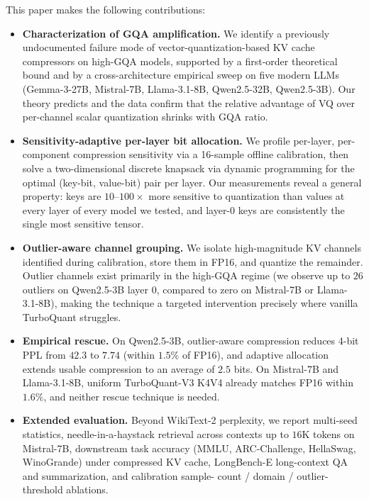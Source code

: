 \documentclass[11pt]{article}
\begin{document}
This paper makes the following contributions:
\begin{itemize}
    \item \textbf{Characterization of GQA amplification.} We identify a
    previously undocumented failure mode of vector-quantization-based KV cache
    compressors on high-GQA models, supported by a first-order theoretical
    bound and by a cross-architecture empirical sweep on five modern LLMs
    (Gemma-3-27B, Mistral-7B, Llama-3.1-8B, Qwen2.5-32B, Qwen2.5-3B). Our
    theory predicts and the data confirm that the relative advantage of VQ
    over per-channel scalar quantization shrinks with GQA ratio.
    \item \textbf{Sensitivity-adaptive per-layer bit allocation.} We profile
    per-layer, per-component compression sensitivity via a 16-sample offline
    calibration, then solve a two-dimensional discrete knapsack via dynamic
    programming for the optimal (key-bit, value-bit) pair per layer. Our
    measurements reveal a general property: keys are $10$--$100\times$ more
    sensitive to quantization than values at every layer of every model we
    tested, and layer-0 keys are consistently the single most sensitive
    tensor.
    \item \textbf{Outlier-aware channel grouping.} We isolate high-magnitude
    KV channels identified during calibration, store them in FP16, and
    quantize the remainder. Outlier channels exist primarily in the high-GQA
    regime (we observe up to $26$ outliers on Qwen2.5-3B layer 0, compared to
    zero on Mistral-7B or Llama-3.1-8B), making the technique a targeted
    intervention precisely where vanilla TurboQuant struggles.
    \item \textbf{Empirical rescue.} On Qwen2.5-3B, outlier-aware
    compression reduces 4-bit PPL from $42.3$ to $7.74$ (within $1.5\%$ of
    FP16), and adaptive allocation extends usable compression to an average
    of $2.5$ bits. On Mistral-7B and Llama-3.1-8B, uniform TurboQuant-V3 K4V4
    already matches FP16 within $1.6\%$, and neither rescue technique is
    needed.
    \item \textbf{Extended evaluation.} Beyond WikiText-2 perplexity, we
    report multi-seed statistics, needle-in-a-haystack retrieval across
    contexts up to $16$K tokens on Mistral-7B, downstream task accuracy
    (MMLU, ARC-Challenge, HellaSwag, WinoGrande) under compressed KV cache,
    LongBench-E long-context QA and summarization, and calibration sample-
    count / domain / outlier-threshold ablations.
\end{itemize}
\end{document}
